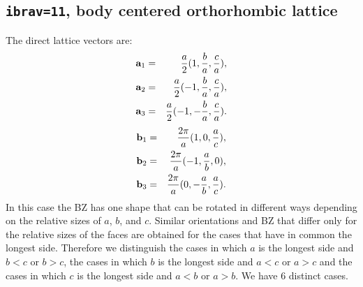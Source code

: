 \documentclass[12pt,a4paper]{article}
\begin{document}
\subsection{\texttt{ibrav=11}, body centered orthorhombic lattice}
The direct lattice vectors are:
\begin{eqnarray}
{\bf a}_1 &=& {a \over 2} (1, {b \over a}, {c \over a}), \nonumber \\
{\bf a}_2 &=& {a \over 2} (-1, {b \over a}, {c \over a}), \nonumber \\
{\bf a}_3 &=& {a \over 2} (-1, -{b \over a}, {c \over a}). \nonumber
\nonumber
\end{eqnarray}
\begin{eqnarray}
{\bf b}_1 &=& {2\pi \over a} (1, 0, {a \over c}), \nonumber \\
{\bf b}_2 &=& {2\pi \over a} (-1, {a \over b}, 0), \nonumber \\
{\bf b}_3 &=& {2\pi \over a} (0, -{a \over b}, {a \over c}). \nonumber
\nonumber
\end{eqnarray}
In this case the BZ has one shape that can be rotated in
different ways depending on the relative sizes of $a$, $b$, and $c$.
Similar orientations and BZ that differ only for the relative sizes of
the faces are obtained for the cases that have in common the longest side.
Therefore we distinguish the cases in which $a$ is the longest side 
and $b<c$ or $b>c$, the cases in which $b$ is the longest side and
$a<c$ or $a>c$ and the cases in which $c$ is the longest side and $a<b$
or $a>b$. We have $6$ distinct cases.
\end{document}
